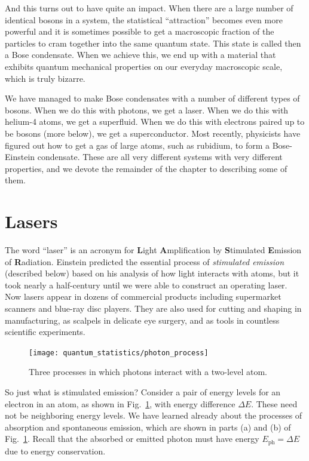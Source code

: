 And this turns out to have quite an impact.  When there are a large
number of identical bosons in a system, the statistical ``attraction''
becomes even more powerful and it is sometimes possible to get a
macroscopic fraction of the particles to cram together into the same
quantum state.  This state is called then a Bose condensate.  When we
achieve this, we end up with a material that exhibits quantum
mechanical properties on our everyday macroscopic scale, which is
truly bizarre.

We have managed to make Bose condensates with a number of different
types of bosons.  When we do this with photons, we get a laser.  When we
do this with helium-4 atoms, we get a superfluid.  When we do this with
electrons paired up to be bosons (more below), we get a superconductor.
Most recently, physicists have figured out how to get a gas of large atoms,
such as rubidium, to form a Bose-Einstein condensate.  These are all very
different systems with very different properties, and we devote the remainder
of the chapter to describing some of them.

\section{Lasers}
\label{sec:lasers}

The word ``laser'' is an acronym for \textbf{L}ight
\textbf{A}mplification by \textbf{S}timulated \textbf{E}mission of
\textbf{R}adiation.  Einstein predicted the essential process of
\textit{stimulated emission} (described below) based on his analysis
of how light interacts with atoms, but it took nearly a half-century
until we were able to construct an operating laser. Now lasers appear
in dozens of commercial products including supermarket scanners and
blue-ray disc players. They are also used for cutting and shaping in
manufacturing, as scalpels in delicate eye surgery, and as tools in
countless scientific experiments.

\begin{figure}[t]
\begin{center}
\texttt{[image: quantum\_statistics/photon\_process]}
\caption{Three processes in which photons interact with a two-level
  atom.}
\label{fig:photon_process}
\end{center}
\end{figure}

So just what is stimulated emission?  Consider a pair of energy levels
for an electron in an atom, as shown in Fig.~\ref{fig:photon_process},
with energy difference $\Delta E$.  These need not be neighboring
energy levels.  We have learned already about the processes of
absorption and spontaneous emission, which are shown in parts (a) and
(b) of Fig.~\ref{fig:photon_process}.  Recall that the absorbed or
emitted photon must have energy $E_\text{ph}=\Delta E$ due to energy
conservation.  



